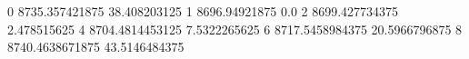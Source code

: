 0 8735.357421875 38.408203125
1 8696.94921875 0.0
2 8699.427734375 2.478515625
4 8704.4814453125 7.5322265625
6 8717.5458984375 20.5966796875
8 8740.4638671875 43.5146484375
